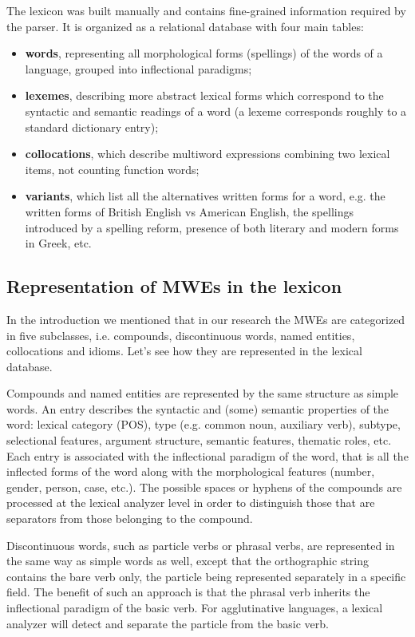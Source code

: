 \documentclass[output=paper]{langsci/langscibook}
\begin{document}
The lexicon was built manually and contains fine-grained information required by the parser. It is organized as a relational database with four main tables:

\vspace*{3mm}
\begin{itemize}
\item \textbf{words}, representing all morphological forms (spellings) of the words of a language, grouped into inflectional paradigms; 
\item \textbf{lexemes}, describing more abstract lexical forms which correspond to the syntactic and semantic readings of a word (a lexeme corresponds roughly to a standard dictionary entry); 
\item \textbf{collocations}, which describe multiword expressions combining two lexical items, not counting function words;
\item \textbf{variants}, which list all the alternatives written forms for a word, e.g. the written forms of British English vs American English, the spellings introduced by a spelling reform, presence of both literary and modern forms in Greek, etc. 

\end{itemize}

\subsection{Representation of MWEs in the lexicon}

In the introduction we mentioned that in our research the MWEs are categorized in five subclasses, i.e. compounds, discontinuous words, named entities, collocations and idioms.
Let's see how they are represented in the lexical database.

Compounds and named entities are represented by the same structure as simple words. An entry describes the syntactic and (some) semantic properties of the word: lexical category (POS),
type (e.g. common noun, auxiliary verb), subtype, selectional features, argument structure, semantic features, thematic roles, etc. Each entry is associated with the inflectional paradigm of the word, 
that is all the inflected forms of the word along with the morphological features (number, gender, person, case, etc.). The possible spaces or hyphens of the compounds are processed 
at the lexical analyzer level in order to distinguish those that are separators from those belonging to the compound.

Discontinuous words, such as particle verbs or phrasal verbs, are represented in the same way as simple words as well, except that the orthographic string contains the bare verb only, 
the particle being represented separately in a specific field. The benefit of such an approach is that the phrasal verb inherits the inflectional paradigm of the basic verb. For agglutinative languages,
a lexical analyzer will detect and separate the particle from the basic verb.
\end{document}
